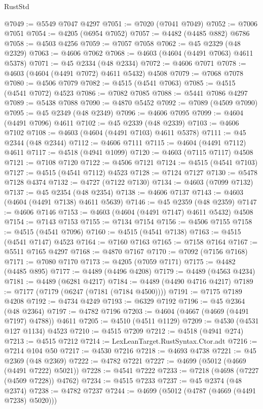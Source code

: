 \begin{lexlean}{RustStd}
\begin{coremodule}
@7049 := @5549 @7047 @4297
@7051 := @7020 (@7041 @7049)
@7052 := @7006 @7051
@7054 := @4205 (@6954 @7052)
@7057 := @4482 (@4485 @882) @6786
@7058 := @4503 @4256
@7059 := @7057 @7058
@7062 := @45 @2329 (@48 @2329)
@7063 := @4606 @7062
@7068 := @4603 (@4604 (@4491 @7063) @4611 @5378)
@7071 := @45 @2334 (@48 @2334)
@7072 := @4606 @7071
@7078 := @4603 (@4604 (@4491 @7072) @4611 @5432) @4508
@7079 := @7068 @7078
@7080 := @4506 @7079
@7082 := @4515 (@4541 @7063)
@7085 := @4515 (@4541 @7072) @4523
@7086 := @7082 @7085
@7088 := @5441 @7086 @4297
@7089 := @5438 @7088
@7090 := @4870 @5452
@7092 := @7089 (@4509 @7090)
@7095 := @45 @2349 (@48 @2349)
@7096 := @4606 @7095
@7099 := @4604 (@4491 @7096) @4611
@7102 := @45 @2339 (@48 @2339)
@7103 := @4606 @7102
@7108 := @4603 (@4604 (@4491 @7103) @4611 @5378)
@7111 := @45 @2344 (@48 @2344)
@7112 := @4606 @7111
@7115 := @4604 (@4491 @7112) @4611
@7117 := @4518 (@4941 @1099)
@7120 := @4603 (@7115 @7117) @4508
@7121 := @7108 @7120
@7122 := @4506 @7121
@7124 := @4515 (@4541 @7103)
@7127 := @4515 (@4541 @7112) @4523
@7128 := @7124 @7127
@7130 := @5478 @7128 @4374
@7132 := @4727 (@7122 @7130)
@7134 := @4603 (@7099 @7132)
@7137 := @45 @2354 (@48 @2354)
@7138 := @4606 @7137
@7143 := @4603 (@4604 (@4491 @7138) @4611 @5639)
@7146 := @45 @2359 (@48 @2359)
@7147 := @4606 @7146
@7153 := @4603 (@4604 (@4491 @7147) @4611 @5432) @4508
@7154 := @7143 @7153
@7155 := @7134 @7154
@7156 := @4506 @7155
@7158 := @4515 (@4541 @7096)
@7160 := @4515 (@4541 @7138)
@7163 := @4515 (@4541 @7147) @4523
@7164 := @7160 @7163
@7165 := @7158 @7164
@7167 := @5511 @7165 @4297
@7168 := @4870 @7167
@7170 := @7092 (@7156 @7168)
@7171 := @7080 @7170
@7173 := @4205 (@7059 @7171)
@7175 := @4482 (@4485 @895)
@7177 := @4489 (@4496 @4208)
@7179 := @4489 (@4563 @4234)
@7181 := @4489 (@6281 @4217)
@7184 := @4489 (@4490 @4716 @4217)
@7189 := @7177 (@7179 (@6247 (@7181 (@7184 @4500))))
@7191 := @7175 @7189 @4208
@7192 := @4734 @4249
@7193 := @6329 @7192
@7196 := @45 @2364 (@48 @2364)
@7197 := @4782 @7196
@7203 := @4604 (@4667 (@4669 (@4491 @7197) @4788)) @4611
@7205 := @4510 (@4511 @1129)
@7209 := @4530 (@4531 @127 @1134) @4523
@7210 := @4515 @7209
@7212 := @4518 (@4941 @274)
@7213 := @4515 @7212
@7214 := LexLeanTarget.RustSyntax.Ctor.adt
@7216 := @7214 @104 @50
@7217 := @4530 @7216
@7218 := @4693 @4738
@7221 := @45 @2369 (@48 @2369)
@7222 := @4782 @7221
@7227 := @4699 (@5012 (@4669 (@4491 @7222) @5021))
@7228 := @4541 @7222
@7233 := @7218 (@4698 (@7227 (@4509 @7228)) @4762)
@7234 := @4515 @7233
@7237 := @45 @2374 (@48 @2374)
@7238 := @4782 @7237
@7244 := @4699 (@5012 (@4787 (@4669 (@4491 @7238) @5020)))

\end{coremodule}
\end{lexlean}
